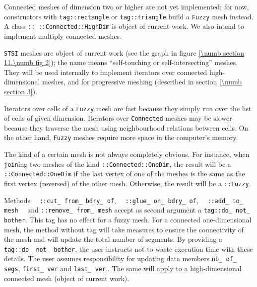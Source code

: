 Connected meshes of dimension two or higher are not yet implemented; for now,
{\small\tt {}} constructors with {\small\tt \textcolor{tag}{tag}::rectangle} or
{\small\tt \textcolor{tag}{tag}::triangle} build a {\small\tt Fuzzy} mesh instead.
A class {\small\tt {}:: ::Connected::HighDim} is object of current work.
We also intend to implement multiply connected meshes.

{\small\tt STSI} meshes are object of current work (see the graph in figure
\ref{\numb section 11.\numb fig 2}); the name means ``self-touching or self-intersecting'' meshes.
They will be used internally to implement iterators over connected high-dimensional meshes,
and for progressive meshing (described in section \ref{\numb section 3}).

Iterators over cells of a {\small\tt Fuzzy} mesh are fast because they simply run over the
list of cells of given dimension.
Iterators over {\small\tt Connected} meshes may be slower because they traverse the mesh using
neighbourhood relations between cells.
On the other hand, {\small\tt Fuzzy} meshes require more space in the computer's memory.

The kind of a certain mesh is not always completely obvious.
For instance, when {\small\tt join}ing two meshes of the kind
{\small\tt {}::Connected::OneDim}, the result will be a
{\small\tt {}::Connected::OneDim} if the last vertex of one of the meshes
is the same as the first vertex (reversed) of the other mesh.
Otherwise, the result will be a {\small\tt {}::Fuzzy}.

Methods \ \ {\small\tt{}::cut\_\,from\_\,bdry\_\,of},
\ \ {\small\tt{}::glue\_\,on\_\,bdry\_\,of}, \ \ {\small\tt{}::add\_\,to\_\,mesh}
\ \ and {\small\tt{}::remove\_\,from\_\,mesh}
accept as second argument a {\small\tt\textcolor{tag}{tag}::do\_\,not\_\,bother}.
This tag has no effect for a fuzzy mesh.
For a connected one-dimensional mesh, the method without tag will take measures
to ensure the connectivity of the mesh and will update the total number of segments.
By providing a {\small\tt\textcolor{tag}{tag}::do\_\,not\_\,bother}, the user instructs
{\maniFEM} not to waste execution time with these details.
The user assumes responsibility for updating data members {\small\tt nb\_\,of\_\,segs},
{\small\tt first\_\,ver} and {\small\tt last\_\,ver}..
The same will apply to a high-dimensional connected mesh (object of current work).



